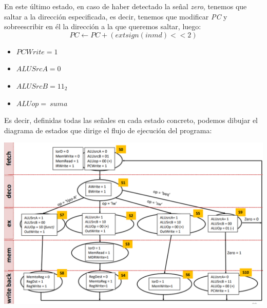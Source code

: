 \documentclass[a4paper,10pt]{book}
\begin{document}
En este último estado, en caso de haber detectado la señal \textit{zero}, tenemos que saltar a la dirección especificada, es decir, tenemos que modificar \textit{PC} y sobreescribir en él la dirección a la que queremos saltar, luego:
$$PC \leftarrow PC + \left( extsign(inmd)  << 2 \right)$$
\begin{itemize}
\item $PCWrite = 1$
\item $ALUSrcA = 0$
\item $ALUSrcB = 11_2$
\item $ALUop = \ suma$
\end{itemize}
Es decir, definidas todas las señales en cada estado concreto, podemos dibujar el diagrama de estados que dirige el flujo de ejecución del programa:
\begin{center}
\includegraphics[scale=0.5]{diagrama de estados controlador}
\end{center}
\end{document}
